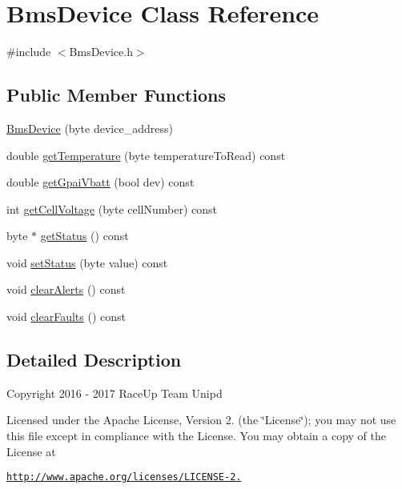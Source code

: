 \hypertarget{class_bms_device}{}\section{Bms\+Device Class Reference}
\label{class_bms_device}


{\ttfamily \#include $<$Bms\+Device.\+h$>$}

\subsection*{Public Member Functions}
\begin{DoxyCompactItemize}
\item 
\hyperlink{class_bms_device_a4035559c9370045a409d33cb8941a9f3}{Bms\+Device} (byte device\+\_\+address)
\item 
double \hyperlink{class_bms_device_ac61154d9b8cc11061dcc7d0243ed955f}{get\+Temperature} (byte temperature\+To\+Read) const 
\item 
double \hyperlink{class_bms_device_a8b11a6a96bc0634e14bb7847b448bab6}{get\+Gpai\+Vbatt} (bool dev) const 
\item 
int \hyperlink{class_bms_device_a0bdebab046f8337914ba88fdd20da1bd}{get\+Cell\+Voltage} (byte cell\+Number) const 
\item 
byte $\ast$ \hyperlink{class_bms_device_ad72700d4da6cc7d6ef52e76091ab9d9a}{get\+Status} () const 
\item 
void \hyperlink{class_bms_device_af711c0fbff46642d525c63a668cb7a2d}{set\+Status} (byte value) const 
\item 
void \hyperlink{class_bms_device_a99aeb3676c9732e8a22d8561b5dde254}{clear\+Alerts} () const 
\item 
void \hyperlink{class_bms_device_a20e255789e1b0d8d16059c8ab1ac32dd}{clear\+Faults} () const 
\end{DoxyCompactItemize}


\subsection{Detailed Description}
Copyright 2016 -\/ 2017 Race\+Up Team Unipd

Licensed under the Apache License, Version 2. (the \char`\"{}\+License\char`\"{}); you may not use this file except in compliance with the License. You may obtain a copy of the License at

\href{http://www.apache.org/licenses/LICENSE-2.0}{\tt http\+://www.\+apache.\+org/licenses/\+L\+I\+C\+E\+N\+S\+E-\/2.}

